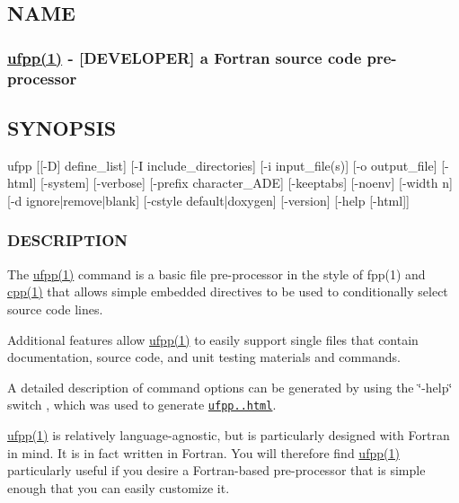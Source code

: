 \href{../../../GPF.html}{\tt }

 

\subsection*{N\+A\+ME}

\subsubsection*{\hyperlink{ufpp__overview_81_8txt_a97c20a96bcab81bc74c9d64b001f1202}{ufpp(1)} -\/ \mbox{[}D\+E\+V\+E\+L\+O\+P\+ER\mbox{]} a Fortran source code pre-\/processor}

\subsection*{S\+Y\+N\+O\+P\+S\+IS}


\begin{DoxyPre}
    ufpp  [[-D] define\_list]
          [-I include\_directories]
          [-i input\_file(s)]
          [-o output\_file]
          [-html]
          [-system]
          [-verbose]
          [-prefix character\_ADE]
          [-keeptabs]
          [-noenv]
          [-width n]
          [-d ignore|remove|blank]
          [-cstyle default|doxygen]
          [-version]
          [-help [-html]]
 \end{DoxyPre}


\subsubsection*{D\+E\+S\+C\+R\+I\+P\+T\+I\+ON}

The \hyperlink{ufpp__overview_81_8txt_a97c20a96bcab81bc74c9d64b001f1202}{ufpp(1)} command is a basic file pre-\/processor in the style of fpp(1) and \hyperlink{ufpp__overview_81_8txt_ad80405d1dd53db5cd0aa7a8cc7e457a3}{cpp(1)} that allows simple embedded directives to be used to conditionally select source code lines. 

Additional features allow \hyperlink{ufpp__overview_81_8txt_a97c20a96bcab81bc74c9d64b001f1202}{ufpp(1)} to easily support single files that contain documentation, source code, and unit testing materials and commands. 

A detailed description of command options can be generated by using the \char`\"{}-\/help\char`\"{} switch , which was used to generate \href{ufpp.1.html}{\tt ufpp..\+html}. 

\hyperlink{ufpp__overview_81_8txt_a97c20a96bcab81bc74c9d64b001f1202}{ufpp(1)} is relatively language-\/agnostic, but is particularly designed with Fortran in mind. It is in fact written in Fortran. You will therefore find \hyperlink{ufpp__overview_81_8txt_a97c20a96bcab81bc74c9d64b001f1202}{ufpp(1)} particularly useful if you desire a Fortran-\/based pre-\/processor that is simple enough that you can easily customize it. 

